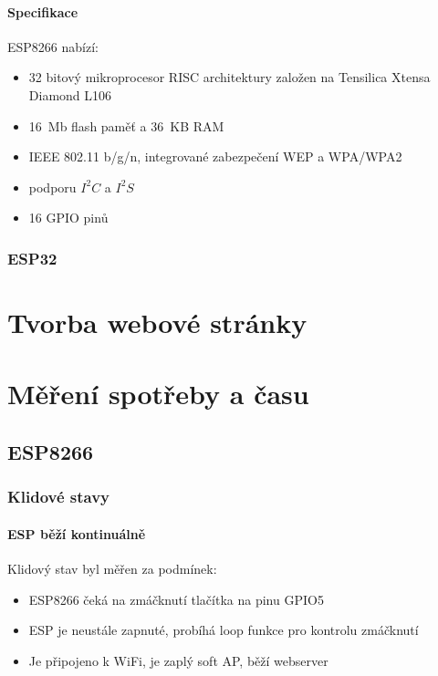 \documentclass[a4paper, 12pt]{report}
\begin{document}
				\subsubsection{Specifikace}
					ESP8266 nabízí:
					\begin{itemize}
						\item 32 bitový mikroprocesor RISC architektury založen na Tensilica Xtensa Diamond L106
						\item \SI{16}{Mb} flash paměť a \SI{36}{KB} RAM
						\item IEEE 802.11 b/g/n, integrované zabezpečení WEP a WPA/WPA2
						\item podporu $I^2C$ a $I^2S$
						\item 16 GPIO pinů

					\end{itemize}
			\subsection{ESP32}
	\chapter{Tvorba webové stránky}
	\chapter{Měření spotřeby a času}
		\section{ESP8266}
			\subsection{Klidové stavy}
				\subsubsection{ESP běží kontinuálně}
					Klidový stav byl měřen za podmínek:
					\begin{itemize}
						\item ESP8266 čeká na zmáčknutí tlačítka na pinu GPIO5
						\item ESP je neustále zapnuté, probíhá loop funkce pro kontrolu zmáčknutí
						\item Je připojeno k WiFi, je zaplý soft AP, běží webserver
					\end{itemize}
\end{document}
